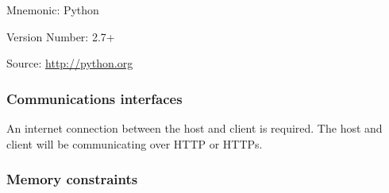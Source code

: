 \begin{description}
{\begin{description}
       \item Mnemonic: Python
       \item Version Number: 2.7+
       \item Source: \url{http://python.org}
     \end{description}
   }
\end{description}




\subsubsection{Communications interfaces}

An internet connection between the host and client is required.
The host and client will be communicating over HTTP or HTTPs.


\subsubsection{Memory constraints}

